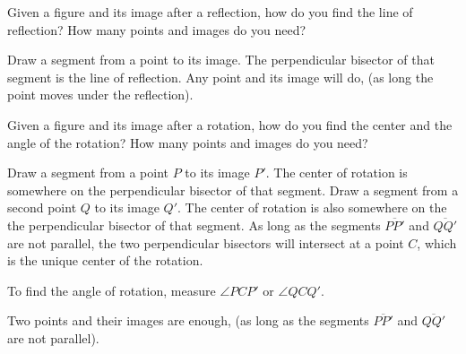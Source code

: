 \documentclass[nooutcomes]{ximera}
\begin{document}
\begin{question}
Given a figure and its image after a reflection, how do you find the line of reflection?  How many points and images do you need?  
\begin{freeResponse}
\begin{hint}
Draw a segment from a point to its image.  The perpendicular bisector of that segment is the line of reflection.  Any point and its image will do, (as long the point moves under the reflection).  
\end{hint}
\end{freeResponse}
\end{question}

\begin{question}
Given a figure and its image after a rotation, how do you find the center and the angle of the rotation?  How many points and images do you need?  
\begin{freeResponse}
\begin{hint}
Draw a segment from a point $P$ to its image $P'$.  The center of rotation is somewhere on the perpendicular bisector of that segment.  Draw a segment from a second point $Q$ to its image $Q'$.  The center of rotation is also somewhere on the the perpendicular bisector of that segment.  As long as the segments $\overline{PP'}$ and $\overline{QQ'}$ are not parallel, the two perpendicular bisectors will intersect at a point $C$, which is the unique center of the rotation.  

To find the angle of rotation, measure $\angle PCP'$ or $\angle QCQ'$.

Two points and their images are enough, (as long as the segments $\overline{PP'}$ and $\overline{QQ'}$ are not parallel). 
\end{hint}
\end{freeResponse}
\end{question}
\end{document}
